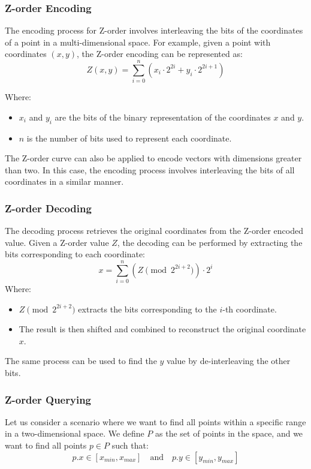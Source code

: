 \subsubsection{Z-order Encoding}

The encoding process for Z-order involves interleaving the bits of the coordinates of a point in a multi-dimensional space. For example, given a point with coordinates \( (x, y) \), the Z-order encoding can be represented as:
\[
    Z(x, y) = \sum_{i=0}^{n} (x_i \cdot 2^{2i} + y_i \cdot 2^{2i+1})
\]

Where:
\begin{itemize}
    \item \( x_i \) and \( y_i \) are the bits of the binary representation of the coordinates \( x \) and \( y \).
    \item \( n \) is the number of bits used to represent each coordinate.
\end{itemize}

The Z-order curve can also be applied to encode vectors with dimensions greater than two. In this case, the encoding process involves interleaving the bits of all coordinates in a similar manner.


\subsubsection{Z-order Decoding}
The decoding process retrieves the original coordinates from the Z-order encoded value. Given a Z-order value \( Z \), the decoding can be performed by extracting the bits corresponding to each coordinate:
\[
    x = \sum_{i=0}^{n} (Z \pmod{ 2^{2i+2} }) \cdot 2^i
\]
Where:
\begin{itemize}
    \item \( Z \pmod{ 2^{2i+2} } \) extracts the bits corresponding to the \( i \)-th coordinate.
    \item The result is then shifted and combined to reconstruct the original coordinate \( x \).
\end{itemize}

The same process can be used to find the $y$ value by de-interleaving the other bits.

\subsubsection{Z-order Querying}
Let us consider a scenario where we want to find all points within a specific range in a two-dimensional space. We define \( P \) as the set of points in the space, and we want to find all points \( p \in P \) such that:
\[
    p.x \in [x_{min}, x_{max}] \quad \text{and} \quad p.y \in [y_{min}, y_{max}]
\]

